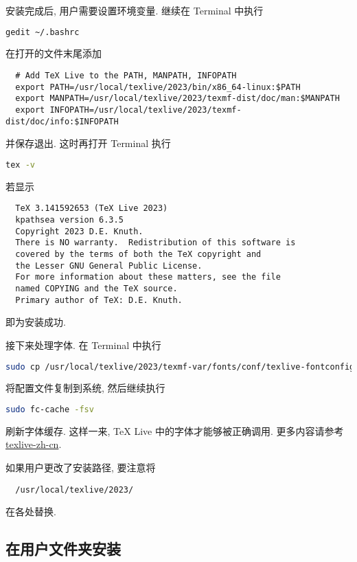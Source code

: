 安装完成后, 用户需要设置环境变量.
继续在 \textsf{Terminal} 中执行
\begin{lstlisting}[language = bash]
  gedit ~/.bashrc
\end{lstlisting}
在打开的文件末尾添加
\begin{lstlisting}
  # Add TeX Live to the PATH, MANPATH, INFOPATH
  export PATH=/usr/local/texlive/2023/bin/x86_64-linux:$PATH
  export MANPATH=/usr/local/texlive/2023/texmf-dist/doc/man:$MANPATH
  export INFOPATH=/usr/local/texlive/2023/texmf-dist/doc/info:$INFOPATH
\end{lstlisting}
并保存退出.
这时再打开 \textsf{Terminal} 执行
\begin{lstlisting}[language=bash]
  tex -v
\end{lstlisting}
若显示
\begin{lstlisting}
  TeX 3.141592653 (TeX Live 2023)
  kpathsea version 6.3.5
  Copyright 2023 D.E. Knuth.
  There is NO warranty.  Redistribution of this software is
  covered by the terms of both the TeX copyright and
  the Lesser GNU General Public License.
  For more information about these matters, see the file
  named COPYING and the TeX source.
  Primary author of TeX: D.E. Knuth.
\end{lstlisting}
即为安装成功.

接下来处理字体.
在 \textsf{Terminal} 中执行
\begin{lstlisting}[language=bash]
  sudo cp /usr/local/texlive/2023/texmf-var/fonts/conf/texlive-fontconfig.conf /etc/fonts/conf.d/09-texlive.conf
\end{lstlisting}
将配置文件复制到系统,
然后继续执行
\begin{lstlisting}[language=bash]
  sudo fc-cache -fsv
\end{lstlisting}
刷新字体缓存.
这样一来, \TeX{} Live 中的字体才能够被正确调用.
更多内容请参考 \href{https://www.tug.org/texlive/doc/texlive-zh-cn/texlive-zh-cn.pdf}{texlive-zh-cn}.

如果用户更改了安装路径,
要注意将
\begin{lstlisting}
  /usr/local/texlive/2023/
\end{lstlisting}
在各处替换.

\subsection{在用户文件夹安装}\label{subsec:ubuntu-user-folder}

